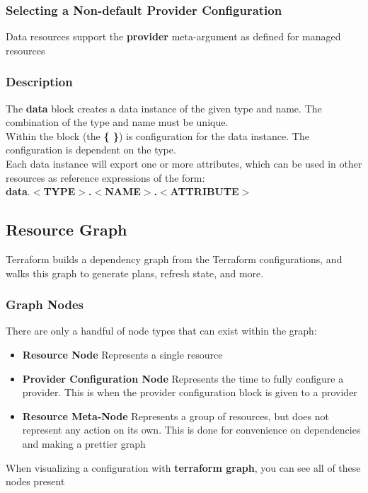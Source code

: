 \documentclass[12pt, letterpaper, twoside]{article}
\begin{document}
\subsubsection{Selecting a Non-default Provider Configuration}
Data resources support the \textbf{provider} meta-argument as defined for managed resources

\subsubsection{Description}
The \textbf{data} block creates a data instance of the given type and name. The combination of 
the type and name must be unique.\\
Within the block (the \textbf{\{ \}}) is configuration for the data instance. The configuration is 
dependent on the type.\\
Each data instance will export one or more attributes, which can be used in other resources as 
reference expressions of the form:\\
\textbf{data$.<$TYPE$>$.$<$NAME$>$.$<$ATTRIBUTE$>$}

\subsection{Resource Graph}
Terraform builds a dependency graph from the Terraform configurations, and walks this graph to 
generate plans, refresh state, and more.

\subsubsection{Graph Nodes}
There are only a handful of node types that can exist within the graph:
\begin{itemize}
	\item \textbf{Resource Node} Represents a single resource
	\item \textbf{Provider Configuration Node} Represents the time to fully configure a provider. This is 
		when the provider configuration block is given to a provider
	\item \textbf{Resource Meta-Node} Represents a group of resources, but does not represent any action 
		on its own. This is done for convenience on dependencies and making a prettier graph
\end{itemize}

When visualizing a configuration with \textbf{terraform graph}, you can see all of these nodes present
\end{document}
